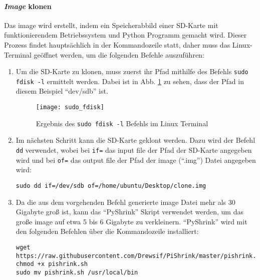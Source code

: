 \paragraph{\textit{Image} klonen}
Das \gls{image} wird erstellt, indem ein Speicherabbild einer SD-Karte mit funktionierendem Betriebssystem und Python Programm gemacht wird. Dieser Prozess findet hauptsächlich in der Kommandozeile statt, daher muss das Linux-Terminal geöffnet werden, um die folgenden Befehle auszuführen:
\begin{enumerate}

    \item Um die SD-Karte zu klonen, muss zuerst ihr Pfad mithilfe des Befehls \texttt{sudo fdisk -l} ermittelt werden. Dabei ist in Abb. \ref{fig:sudo_fdisk} zu sehen, dass der Pfad in diesem Beispiel \enquote{dev/sdb} ist.
    \begin{figure}[H]
        \centering
        \texttt{[image: sudo\_fdisk]}
        \caption{Ergebnis des \texttt{sudo fdisk -l} Befehls im Linux Terminal}
        \label{fig:sudo_fdisk}
    \end{figure}
    
    \item Im nächsten Schritt kann die SD-Karte geklont werden. Dazu wird der Befehl \texttt{dd} verwendet, wobei bei \texttt{if=} das input file \bzw der Pfad der SD-Karte angegeben wird und bei \texttt{of=} das output file \bzw der Pfad der \gls{image} (\enquote{.img}) Datei angegeben wird:
    \begin{verbatim}
sudo dd if=/dev/sdb of=/home/ubuntu/Desktop/clone.img
    \end{verbatim}

    \item Da die aus dem vorgehenden Befehl generierte \gls{image} Datei mehr als 30 Gigabyte groß ist, kann das \enquote{PyShrink} Skript verwendet werden, um das große  \gls{image} auf etwa 5 bis 6 Gigabyte zu verkleinern. \enquote{PyShrink} wird mit den folgenden Befehlen über die Kommandozeile installiert:
    \begin{verbatim}
wget https://raw.githubusercontent.com/Drewsif/PiShrink/master/pishrink.sh
chmod +x pishrink.sh
sudo mv pishrink.sh /usr/local/bin
    \end{verbatim}


\end{enumerate}
